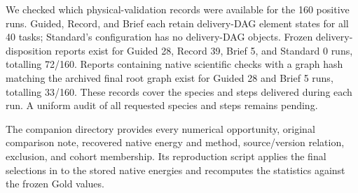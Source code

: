 We checked which physical-validation records were available for the 160 positive runs. Guided, Record, and Brief each retain delivery-DAG element states for all 40 tasks; Standard's configuration has no delivery-DAG objects. Frozen delivery-disposition reports exist for Guided 28, Record 39, Brief 5, and Standard 0 runs, totalling 72/160. Reports containing native scientific checks with a graph hash matching the archived final root graph exist for Guided 28 and Brief 5 runs, totalling 33/160. These records cover the species and steps delivered during each run. A uniform audit of all requested species and steps remains pending.

The companion directory  provides every numerical opportunity, original comparison note, recovered native energy and method, source/version relation, exclusion, and cohort membership. Its reproduction script applies the final selections in  to the stored native energies and recomputes the statistics against the frozen Gold values.
